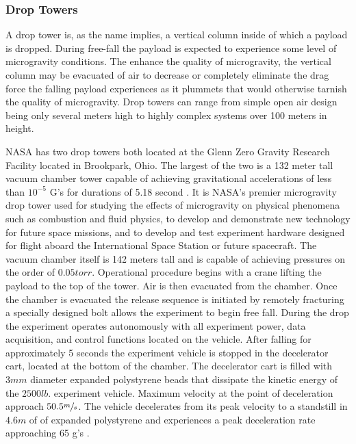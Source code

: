 \subsubsection{Drop Towers}

\indent\indent A drop tower is, as the name implies, a vertical column inside of which a payload is dropped. During free-fall the payload is expected to experience some level of microgravity conditions. The enhance the quality of microgravity, the vertical column may be evacuated of air to decrease or completely eliminate the drag force the falling payload experiences as it plummets that would otherwise tarnish the quality of microgravity. Drop towers can range from simple open air design being only several meters high to highly complex systems over 100 meters in height.

NASA has two drop towers both located at the Glenn Zero Gravity Research Facility located in Brookpark, Ohio. The largest of the two is a 132 meter tall vacuum chamber tower capable of achieving gravitational accelerations of less than $10^{\minus 5}$ G's for durations of 5.18 second \cite{NASA0G}. It is NASA's premier microgravity drop tower used for studying the effects of microgravity on physical phenomena such as combustion and fluid physics, to develop and demonstrate new technology for future space missions, and to develop and test experiment hardware designed for flight aboard the International Space Station or future spacecraft. The vacuum chamber itself is 142 meters tall and is capable of achieving pressures on the order of $0.05 torr$. Operational procedure begins with a crane lifting the payload to the top of the tower. Air is then evacuated from the chamber. Once the chamber is evacuated the release sequence is initiated by remotely fracturing a specially designed bolt allows the experiment to begin free fall. During the drop the experiment operates autonomously with all experiment power, data acquisition, and control functions located on the vehicle. After falling for approximately 5 seconds the experiment vehicle is stopped in the decelerator cart, located at the bottom of the chamber. The decelerator cart is filled with $3 mm$ diameter expanded polystyrene beads that dissipate the kinetic energy of the $2500 lb$. experiment vehicle. Maximum velocity at the point of deceleration approach $50.5 \sfrac{m}{s}$. The vehicle decelerates from its peak velocity to a standstill in $4.6 m$ of of expanded polystyrene and experiences a peak deceleration rate approaching 65 g's \cite{NASA0G}.


